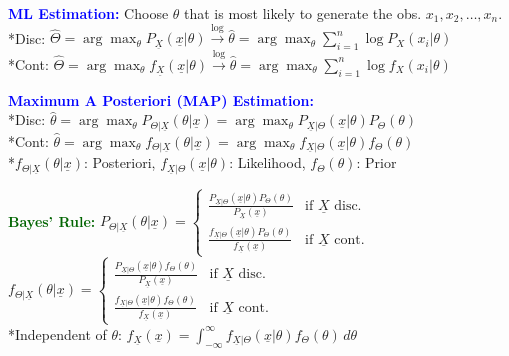 \documentclass[5pt]{extarticle} %
\begin{document}
\begin{paracol}{3}
{    \textcolor{blue}{\textbf{ML Estimation:}} Choose $\theta$ that is most likely to generate the obs. $x_1, x_2, \ldots, x_n$. \\
    *Disc: $\hat{\Theta} = \arg \max_\theta P_{\underline{X}} (\underline{x} | \theta) \overset{\text{log}}{\rightarrow} \hat{\theta} = \arg \max_\theta \sum_{i=1}^n \log P_X(x_i | \theta)$ \\
    *Cont: $\hat{\Theta} = \arg \max_\theta f_{\underline{X}} (\underline{x} | \theta) \overset{\text{log}}{\rightarrow} \hat{\theta} = \arg \max_\theta \sum_{i=1}^n \log f_X(x_i | \theta)$

    \textcolor{blue}{\textbf{Maximum A Posteriori (MAP) Estimation:}} \\
    *Disc: $\hat{\theta} = \arg \max_\theta P_{\Theta | \underline{X}} (\theta | \underline{x}) = \arg \max_\theta P_{\underline{X} | \Theta} (\underline{x} | \theta) P_\Theta (\theta)$\\
    *Cont: $\hat{\theta} = \arg \max_\theta f_{\Theta | \underline{X}} (\theta | \underline{x}) = \arg \max_\theta f_{\underline{X} | \Theta} (\underline{x} | \theta) f_\Theta (\theta)$ \\
    *$f_{\Theta | \underline{X}} (\theta | \underline{x})$: Posteriori, $f_{\underline{X} | \Theta} (\underline{x} | \theta)$: Likelihood, $f_\Theta (\theta)$: Prior

    \textcolor{darkgreen}{\textbf{Bayes' Rule:}} $P_{\Theta | \underline{X}} (\theta | \underline{x}) = \begin{cases}
        \frac{P_{\underline{X} | \Theta} (\underline{x} | \theta) P_\Theta (\theta)}{P_{\underline{X}} (\underline{x})} & \text{if } \underline{X} \text{ disc.} \\
        \frac{f_{\underline{X} | \Theta} (\underline{x} | \theta) P_\Theta (\theta)}{f_{\underline{X}} (\underline{x})} & \text{if } \underline{X} \text{ cont.}
    \end{cases}$ \\
    $f_{\Theta | \underline{X}} (\theta | \underline{x}) = \begin{cases}
        \frac{P_{\underline{X} | \Theta} (\underline{x} | \theta) f_\Theta (\theta)}{P_{\underline{X}} (\underline{x})} & \text{if } \underline{X} \text{ disc.} \\
        \frac{f_{\underline{X} | \Theta} (\underline{x} | \theta) f_\Theta (\theta)}{f_{\underline{X}} (\underline{x})} & \text{if } \underline{X} \text{ cont.} 
    \end{cases}$ \\
    *Independent of $\theta$: $f_{\underline{X}} (\underline{x}) = \int_{-\infty}^{\infty} f_{\underline{X} | \Theta} (\underline{x} | \theta) f_\Theta (\theta) \, d\theta$ \\

}
\end{paracol}
\end{document}
